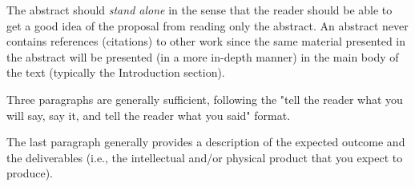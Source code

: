 \documentclass[12pt,american]{report}
\begin{document}
\beforepreface%

\renewcommand{\baselinestretch}{1.5}
\small\normalsize

\newcommand{\etc} {\emph{etc.\/}}
\newcommand{\etal}{\emph{et~al.\/}}
\newcommand{\eg}  {\emph{e.g.\/}}
\newcommand{\ie}  {\emph{i.e.\/}}

\begin{abstractpage}
The abstract should \emph{stand alone} in the sense that the reader should be 
able to get a good idea of the proposal from reading only the abstract.  An 
abstract never contains references (citations) to other work since the same 
material presented in the abstract will be presented (in a more in-depth 
manner) in the main body of the text (typically the Introduction section).

Three paragraphs are generally sufficient, following the "tell the reader 
what you will say, say it, and tell the reader what you said" format.

The last paragraph generally provides a description of the expected 
outcome and the deliverables (i.e., the intellectual and/or physical 
product that you expect to produce).
\end{abstractpage}

\tablespagefalse

\figurespagefalse

\end{document}
